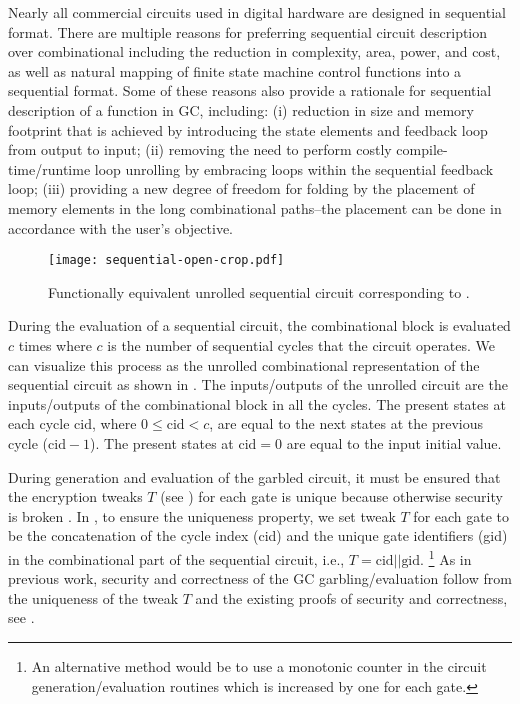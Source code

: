 Nearly all commercial circuits used in digital hardware are designed in sequential format.
There are multiple reasons for preferring sequential circuit description over combinational including the reduction in complexity, area, power, and cost, as well as natural mapping of finite state machine control functions into a sequential format.
Some of these reasons also provide a rationale for sequential description of a function in GC, including: (i) reduction in size and memory footprint that is achieved by introducing the state elements and feedback loop from output to input; (ii) removing the need to perform costly compile-time/runtime loop unrolling by embracing loops within the sequential feedback loop; (iii) providing a new degree of freedom for folding by the placement of memory elements in the long combinational paths--the placement can be done in accordance with the user's objective.

\begin{figure}[t]
    \centering
	\texttt{[image: sequential-open-crop.pdf]}
	\caption{Functionally equivalent unrolled sequential circuit corresponding to .}
	\label{fig:open-sequential}
\end{figure}

During the evaluation of a sequential circuit, the combinational block is evaluated $c$ times where $c$ is the number of sequential cycles that the circuit operates.
We can visualize this process as the unrolled combinational representation of the sequential circuit as shown in .
The inputs/outputs of the unrolled circuit are the inputs/outputs of the combinational block in all the cycles.
The present states at each cycle $\textrm{cid}$, where $0 \le \textrm{cid} < c$, are equal to the next states at the previous cycle ($\textrm{cid}-1$).
The present states at $\textrm{cid}=0$ are equal to the input initial value.

During generation and evaluation of the garbled circuit, it must be ensured that the encryption tweaks $T$ (see ) for each gate is unique because otherwise security is broken \cite[Sect. 3.4]{HS13}.
In \sys{}, to ensure the uniqueness property, we set tweak $T$ for each gate to be the concatenation of the cycle index (cid) and the unique gate identifiers (gid) in the combinational part of the sequential circuit, i.e., $T = \textrm{cid} || \textrm{gid}$.
\footnote{An alternative method would be to use a monotonic counter in the circuit generation/evaluation routines which is increased by one for each gate.}
As in previous work, security and correctness of the GC garbling/evaluation follow from the uniqueness of the tweak $T$ and the existing proofs of security and correctness, see \cite{LP09,bellare2013efficient}.
